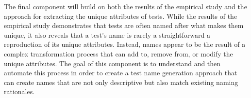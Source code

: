 The final component will build on both the results of the empirical study and the approach for extracting the unique attributes of tests.
%
While the results of the empirical study demonstrates that tests are often named after what makes them unique, it also reveals that a test's name is rarely a straightforward a reproduction of its unique attributes.
%
Instead, names appear to be the result of a complex transformation process that can add to, remove from, or modify the unique attributes.
%
The goal of this component is to understand and then automate this process in order to create a test name generation approach that can create names that are not only descriptive but also match existing naming rationales.